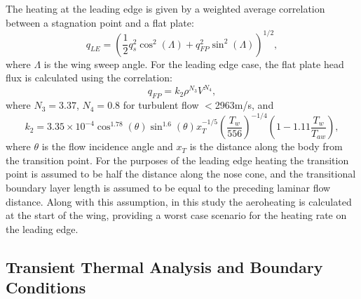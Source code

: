 The heating at the leading edge is given by a weighted average correlation between a stagnation point and a flat plate\cite{Dirkx,Tauber2008}:
\begin{equation}
q_{LE} = (\frac{1}{2}q_s^2 \cos^2(\Lambda) + q_{FP}^2 \sin^2(\Lambda))^{1/2},
\end{equation}
where $\Lambda$ is the wing sweep angle. For the leading edge case, the flat plate head flux is calculated using the correlation:
\begin{equation}
q_{FP} = k_2\rho^{N_3}V^{N_4},
\end{equation}
where $N_3 = 3.37$, $N_4 = 0.8$ for turbulent flow $<$2963m/s\cite{Dirkx,Tauber2008}, and
\begin{equation}
k_2 = 3.35 \times 10^{-4} \cos^{1.78}(\theta) \sin^{1.6}(\theta) x_T^{-1/5} (\frac{T_w}{556})^{-1/4} (1 - 1.11\frac{T_w}{T_{aw}}),
\end{equation}
where $\theta$ is the flow incidence angle and $x_T$ is the distance along the body from the transition point\cite{Dirkx,Tauber2008}. For the purposes of the leading edge heating the transition point is assumed to be half the distance along the nose cone, and the transitional boundary layer length is assumed to be equal to the preceding laminar flow distance. Along with this assumption, in this study the aeroheating is calculated at the start of the wing, providing a worst case scenario for the heating rate on the leading edge. 


\subsection{Transient Thermal Analysis and Boundary Conditions}


